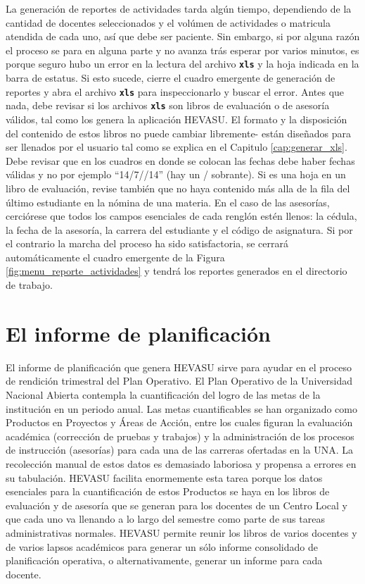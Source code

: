 \documentclass[letterpaper,12pt]{book}
\newcommand{\fileformat}[1]{\textbf{\texttt{#1}}}
\begin{document}
La generación de reportes de actividades tarda algún tiempo, dependiendo de la cantidad de docentes seleccionados y el volúmen de actividades o matricula atendida de cada uno, así que debe ser paciente. Sin embargo, si por alguna razón el proceso se para en alguna parte y no avanza trás esperar por varios minutos, es porque seguro hubo un error en la lectura del archivo \fileformat{xls} y la hoja indicada en la barra de estatus. Si esto sucede, cierre el cuadro emergente de generación de reportes y abra el archivo \fileformat{xls} para inspeccionarlo y buscar el error. Antes que nada, debe revisar si los archivos \fileformat{xls} son libros de evaluación o de asesoría válidos, tal como los genera la aplicación HEVASU. El formato y la disposición del contenido de estos libros no puede cambiar libremente- están diseñados para ser llenados por el usuario tal como se explica en el Capitulo \ref{cap:generar_xls}. Debe revisar que en los cuadros en donde se colocan las fechas debe haber fechas válidas y no por ejemplo ``14/7//14'' (hay un / sobrante). Si es una hoja en un libro de evaluación, revise también que no haya contenido más alla de la fila del último estudiante en la nómina de una materia. En el caso de las asesorías, cerciórese que todos los campos esenciales de cada renglón estén llenos: la cédula, la fecha de la asesoría, la carrera del estudiante y el código de asignatura. Si por el contrario la marcha del proceso ha sido satisfactoria, se cerrará automáticamente el cuadro emergente de la Figura \ref{fig:menu_reporte_actividades} y tendrá los reportes generados en el directorio de trabajo.

\section{El informe de planificación}

El informe de planificación que genera HEVASU sirve para ayudar en el proceso de rendición trimestral del Plan Operativo. El Plan Operativo de la Universidad Nacional Abierta contempla la cuantificación del logro de las metas de la institución en un periodo anual. Las metas cuantificables se han organizado como Productos en Proyectos y Áreas de Acción, entre los cuales figuran la evaluación académica (corrección de pruebas y trabajos) y la administración de los procesos de instrucción (asesorías) para cada una de las carreras ofertadas en la UNA. La recolección manual de estos datos es demasiado laboriosa y propensa a errores en su tabulación. HEVASU facilita enormemente esta tarea porque los datos esenciales para la cuantificación de estos Productos se haya en los libros de evaluación y de asesoría que se generan para los docentes de un Centro Local y que cada uno va llenando a lo largo del semestre como parte de sus tareas administrativas normales. HEVASU permite reunir los libros de varios docentes y de varios lapsos académicos para generar un sólo informe consolidado de planificación operativa, o alternativamente, generar un informe para cada docente.
\end{document}

